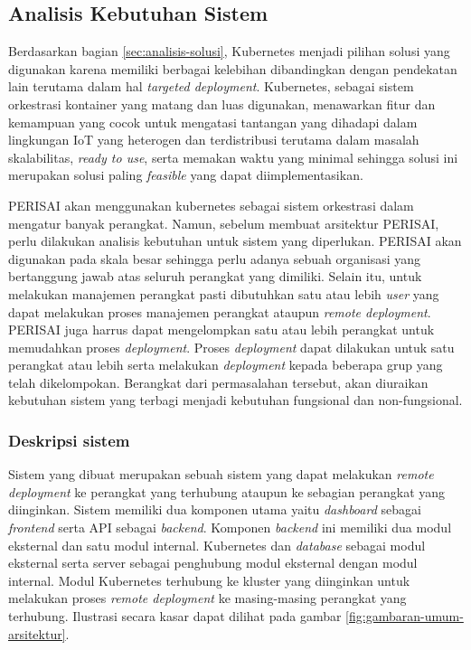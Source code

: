 \subsection{Analisis Kebutuhan Sistem}
\label{sec:analisis-kebutuhan-sistem}

Berdasarkan bagian \ref{sec:analisis-solusi}, Kubernetes menjadi pilihan solusi yang digunakan karena memiliki berbagai kelebihan dibandingkan dengan pendekatan lain terutama dalam hal \textit{targeted deployment}. Kubernetes, sebagai sistem orkestrasi kontainer yang matang dan luas digunakan, menawarkan fitur dan kemampuan yang cocok untuk mengatasi tantangan yang dihadapi dalam lingkungan IoT yang heterogen dan terdistribusi terutama dalam masalah skalabilitas, \textit{ready to use}, serta memakan waktu yang minimal sehingga solusi ini merupakan solusi paling \textit{feasible} yang dapat diimplementasikan.

PERISAI akan menggunakan kubernetes sebagai sistem orkestrasi dalam mengatur banyak perangkat. Namun, sebelum membuat arsitektur PERISAI, perlu dilakukan analisis kebutuhan untuk sistem yang diperlukan. PERISAI akan digunakan pada skala besar sehingga perlu adanya sebuah organisasi yang bertanggung jawab atas seluruh perangkat yang dimiliki. Selain itu, untuk melakukan manajemen perangkat pasti dibutuhkan satu atau lebih \textit{user} yang dapat melakukan proses manajemen perangkat ataupun \textit{remote deployment}. PERISAI juga harrus dapat mengelompkan satu atau lebih perangkat untuk memudahkan proses \textit{deployment}. Proses \textit{deployment} dapat dilakukan untuk satu perangkat atau lebih serta melakukan \textit{deployment} kepada beberapa grup yang telah dikelompokan. Berangkat dari permasalahan tersebut, akan diuraikan kebutuhan sistem yang terbagi menjadi kebutuhan fungsional dan non-fungsional.

\subsubsection{Deskripsi sistem}
Sistem yang dibuat merupakan sebuah sistem yang dapat melakukan \textit{remote deployment} ke perangkat yang terhubung ataupun ke sebagian perangkat yang diinginkan. Sistem memiliki dua komponen utama yaitu \textit{dashboard} sebagai \textit{frontend} serta API sebagai \textit{backend}. Komponen \textit{backend} ini memiliki dua modul eksternal dan satu modul internal. Kubernetes dan \textit{database} sebagai modul eksternal serta server sebagai penghubung modul eksternal dengan modul internal. Modul Kubernetes terhubung ke kluster yang diinginkan untuk melakukan proses \textit{remote deployment} ke masing-masing perangkat yang terhubung. Ilustrasi secara kasar dapat dilihat pada gambar \ref{fig:gambaran-umum-arsitektur}.

